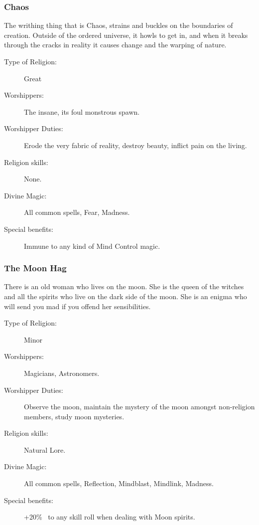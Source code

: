 \subsubsection{Chaos}
The writhing thing that is Chaos, strains and buckles on the boundaries of creation. Outside of the ordered universe, it howls to get in, and when it breaks through the cracks in reality it causes change and the warping of nature. 

\begin{description}
\item[Type of Religion:] Great
\item[Worshippers:] The insane, its foul monstrous spawn.
\item[Worshipper Duties:] Erode the very fabric of reality, destroy beauty, inflict pain on the living.
\item[Religion skills:] None.
\item[Divine Magic:] All common spells, Fear, Madness.
\item[Special benefits:] Immune to any kind of Mind Control magic.
\end{description}


\subsubsection{The Moon Hag}
There is an old woman who lives on the moon. She is the queen of the witches and all the spirits who live on the dark side of the moon. She is an enigma who will send you mad if you offend her sensibilities. 

\begin{description}
\item[Type of Religion:] Minor
\item[Worshippers:] Magicians, Astronomers.
\item[Worshipper Duties:] Observe the moon, maintain the mystery of the moon amongst non-religion members, study moon mysteries.
\item[Religion skills:] Natural Lore.
\item[Divine Magic:] All common spells, Reflection, Mindblast, Mindlink, Madness.
\item[Special benefits:] +20\%  to any skill roll when dealing with Moon spirits.
\end{description}



